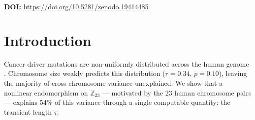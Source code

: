 \documentclass[11pt,a4paper]{article}
\begin{document}

\begin{abstract}
\noindent
We define a nonlinear endomorphism $f: \mathbb{Z}_{23} \to \mathbb{Z}_{23}$ with basin structure $[9, 7, 1, 6]$ and cycle type $(3, 3, 2, 1)$. Mapping human chromosomes 1--23 to $\mathbb{Z}_{23}$ elements, the squared transient length $\tau^2$ predicts pan-cancer driver mutation frequency at $r = +0.735$ (permutation $p = 0.0064$, $R^2 = 0.54$, Cohen's $f^2 = 1.17$). We validate this across \textbf{ten independent biological measures}: COSMIC driver frequency, PCAWG mutation density, loss of heterozygosity, ATAC-seq chromatin accessibility, drug response rates, Phase~III trial success, a novel $\tau$-Druggability Score, Ising pathway barriers, telomere length, and telomere shortening rate. The framework extends to aging (cancer peaks when the last transient windows close at age 50--70), neurodegeneration (all five major disease genes reside on $\tau = 0$ periodic chromosomes), and immunology (regulatory T-cells as the fixed point). We introduce the universal intervention timing formula $W = \tau^2 \cdot \tau_1 \cdot \Omega^{s/s_{\max}}$ governing therapeutic windows from femtosecond enzyme catalysis to multi-decade cancer progression.
\end{abstract}

\vspace{0.5em}
\noindent\textbf{DOI:} \url{https://doi.org/10.5281/zenodo.19414485}

\tableofcontents
\newpage


\section{Introduction}

Cancer driver mutations are non-uniformly distributed across the human genome \citep{Bailey2018, Sondka2018}. Chromosome size weakly predicts this distribution ($r = 0.34$, $p = 0.10$), leaving the majority of cross-chromosome variance unexplained. We show that a nonlinear endomorphism on $\mathbb{Z}_{23}$ --- motivated by the 23 human chromosome pairs --- explains 54\% of this variance through a single computable quantity: the transient length $\tau$.
\end{document}
